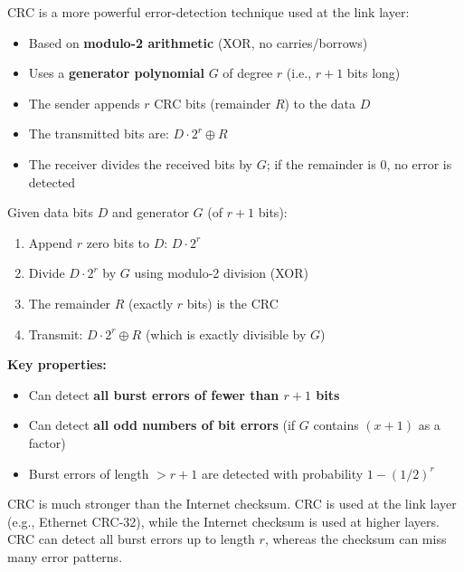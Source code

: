 \begin{keybox}
CRC is a more powerful error-detection technique used at the link layer:
\begin{itemize}[noitemsep]
    \item Based on \textbf{modulo-2 arithmetic} (XOR, no carries/borrows)
    \item Uses a \textbf{generator polynomial} $G$ of degree $r$ (i.e., $r+1$ bits long)
    \item The sender appends $r$ CRC bits (remainder $R$) to the data $D$
    \item The transmitted bits are: $D \cdot 2^r \oplus R$
    \item The receiver divides the received bits by $G$; if the remainder is 0, no error is detected
\end{itemize}
\end{keybox}

\begin{formulabox}
Given data bits $D$ and generator $G$ (of $r+1$ bits):
\begin{enumerate}[noitemsep]
    \item Append $r$ zero bits to $D$: $D \cdot 2^r$
    \item Divide $D \cdot 2^r$ by $G$ using modulo-2 division (XOR)
    \item The remainder $R$ (exactly $r$ bits) is the CRC
    \item Transmit: $D \cdot 2^r \oplus R$ (which is exactly divisible by $G$)
\end{enumerate}

\medskip
\textbf{Key properties:}
\begin{itemize}[noitemsep]
    \item Can detect \textbf{all burst errors of fewer than $r+1$ bits}
    \item Can detect \textbf{all odd numbers of bit errors} (if $G$ contains $(x+1)$ as a factor)
    \item Burst errors of length $> r+1$ are detected with probability $1 - (1/2)^r$
\end{itemize}
\end{formulabox}

\begin{imagebox}
\end{imagebox}

\begin{warnbox}
CRC is much stronger than the Internet checksum. CRC is used at the link layer (e.g., Ethernet CRC-32), while the Internet checksum is used at higher layers. CRC can detect all burst errors up to length $r$, whereas the checksum can miss many error patterns.
\end{warnbox}

